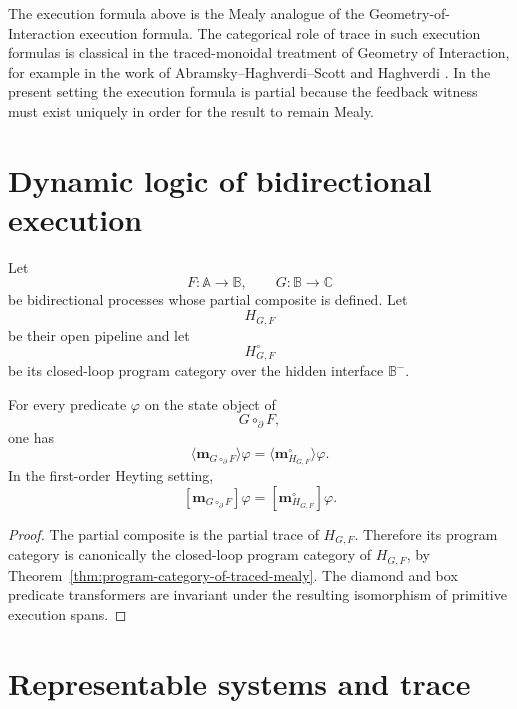 \begin{remark}
\label{rem:relation-goi}
The execution formula above is the Mealy analogue of the
Geometry-of-Interaction execution formula.  The categorical role of trace in
such execution formulas is classical in the traced-monoidal treatment of
Geometry of Interaction, for example in the work of
Abramsky--Haghverdi--Scott and Haghverdi
\cite{AbramskyHaghverdiScottGoI,HaghverdiTypedGoI}.  In the present setting
the execution formula is partial because the feedback witness must exist
uniquely in order for the result to remain Mealy.
\end{remark}

\section{Dynamic logic of bidirectional execution}
\label{sec:dynamic-logic-bidirectional-execution}

Let
\[
F:\mathbb A\to\mathbb B,
\qquad
G:\mathbb B\to\mathbb C
\]
be bidirectional processes whose partial composite is defined.  Let
\[
H_{G,F}
\]
be their open pipeline and let
\[
H_{G,F}^{\circ}
\]
be its closed-loop program category over the hidden interface \(\mathbb B^-\).

\begin{theorem}
\label{thm:dynamic-logic-int-composition}
For every predicate \(\varphi\) on the state object of
\[
G\circ_{\partial}F,
\]
one has
\[
\langle
\mathbf m_{G\circ_{\partial}F}
\rangle\varphi
=
\langle
\mathbf m_{H_{G,F}}^{\circ}
\rangle\varphi.
\]
In the first-order Heyting setting,
\[
[
\mathbf m_{G\circ_{\partial}F}
]\varphi
=
[
\mathbf m_{H_{G,F}}^{\circ}
]\varphi.
\]
\end{theorem}

\begin{proof}
The partial composite is the partial trace of \(H_{G,F}\).  Therefore its
program category is canonically the closed-loop program category of
\(H_{G,F}\), by Theorem~\ref{thm:program-category-of-traced-mealy}.  The
diamond and box predicate transformers are invariant under the resulting
isomorphism of primitive execution spans.
\end{proof}

\section{Representable systems and trace}
\label{sec:representable-systems-and-trace}

